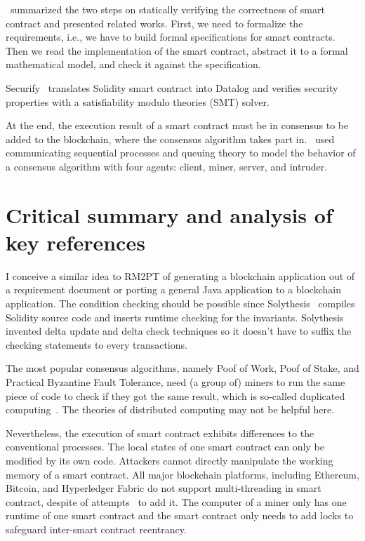 \cite{tolmach2021survey}~summarized the two steps on statically verifying the correctness of smart contract and presented related works.
First, we need to formalize the requirements, i.e., we have to build formal specifications for smart contracts.
Then we read the implementation of the smart contract, abstract it to a formal mathematical model, and check it against the specification.

Securify~\cite{tsankov2018securify} translates Solidity smart contract into Datalog and verifies security properties with a satisfiability modulo theories (SMT) solver.



At the end, the execution result of a smart contract must be in consensus to be added to the blockchain, where the consensus algorithm takes part in.
\cite{altarawneh2021availability}~used communicating sequential processes and queuing theory to model the behavior of a consensus algorithm with four agents: client, miner, server, and intruder.





\section{Critical summary and analysis of key references}


I conceive a similar idea to RM2PT of generating a blockchain application out of a requirement document or porting a general Java application to a blockchain application. The condition checking should be possible since Solythesis~\cite{li2020securing} compiles Solidity source code and inserts runtime checking for the invariants. Solythesis invented delta update and delta check techniques so it doesn't have to suffix the checking statements to every transactions.

The most popular consensus algorithms, namely Poof of Work, Poof of Stake, and Practical Byzantine Fault Tolerance, need (a group of) miners to run the same piece of code to check if they got the same result, which is so-called duplicated computing~\cite{shae2018transform}. The theories of distributed computing may not be helpful here.

Nevertheless, the execution of smart contract exhibits differences to the conventional processes.
The local states of one smart contract can only be modified by its own code. Attackers cannot directly manipulate the working memory of a smart contract.
All major blockchain platforms, including Ethereum, Bitcoin, and Hyperledger Fabric do not support multi-threading in smart contract, despite of attempts~\cite{anjana2019efficient,yu2018parallel} to add it. The computer of a miner only has one runtime of one smart contract and the smart contract only needs to add locks to safeguard inter-smart contract reentrancy.


